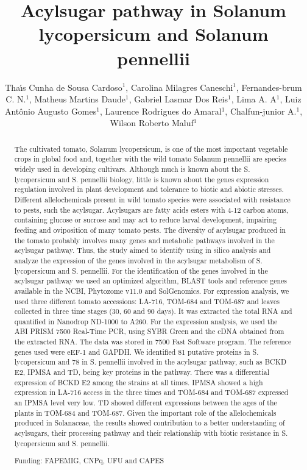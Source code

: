 \documentclass[twoside]{article}
\title{\vspace{-15mm}\fontsize{24pt}{10pt}\selectfont\textbf{Acylsugar pathway in Solanum lycopersicum and Solanum pennellii}} %
\author{Tha\'{\i}s Cunha de Sousa Cardoso$^1$, Carolina Milagres Caneschi$^1$, Fernandes-brum C. N.$^1$, Matheus Martins Daude$^1$, Gabriel Lasmar Dos Reis$^1$, Lima A. A$^1$, Luiz Ant\^onio Augusto Gomes$^1$, Laurence Rodrigues do Amaral$^1$, Chalfun-junior A.$^1$, Wilson Roberto Maluf$^1$}
\affil{1 UFU\\ }
\date{}
\begin{document}
\maketitle %

\thispagestyle{fancy} %


\begin{abstract}
The cultivated tomato, Solanum lycopersicum, is one of the most important vegetable crops in global food and, together with the wild tomato Solanum pennellii are species widely used in developing cultivars. Although much is known about the S. lycopersicum and S. pennellii biology, little is known about the genes expression regulation involved in plant development and tolerance to biotic and abiotic stresses. Different allelochemicals present in wild tomato species were associated with resistance to pests, such the acylsugar. Acylsugars are fatty acids esters with 4-12 carbon atoms, containing glucose or sucrose and may act to reduce larval development, impairing feeding and oviposition of many tomato pests. The diversity of acylsugar produced in the tomato probably involves many genes and metabolic pathways involved in the acylsugar pathway. Thus, the study aimed to identify using in silico analysis and analyze the expression of the genes involved in the acylsugar metabolism of S. lycopersicum and S. pennellii. For the identification of the genes involved in the acylsugar pathway we used an optimized algorithm, BLAST tools and reference genes available in the NCBI, Phytozome v11.0 and SolGenomics. For expression analysis, we used three different tomato accessions: LA-716, TOM-684 and TOM-687 and leaves collected in three time stages (30, 60 and 90 days). It was extracted the total RNA and quantified in Nanodrop\textsuperscript{\textcopyright} ND-1000 to A260. For the expression analysis, we used the ABI PRISM 7500 Real-Time PCR, using SYBR Green and the cDNA obtained from the extracted RNA. The data was stored in 7500 Fast Software program. The reference genes used were eEF-1 and GAPDH. We identified 81 putative proteins in S. lycopersicum and 78 in S. pennellii involved in the acylsugar pathway, such as BCKD E2, IPMSA and TD, being key proteins in the pathway. There was a differential expression of BCKD E2 among the strains at all times. IPMSA showed a high expression in LA-716 access in the three times and TOM-684 and TOM-687 expressed an IPMSA level very low. TD showed different expressions between the ages of the plants in TOM-684 and TOM-687. Given the important role of the allelochemicals produced in Solanaceae, the results showed contribution to a better understanding of acylsugars, their processing pathway and their relationship with biotic resistance in S. lycopersicum and S. pennellii.

Funding: FAPEMIG, CNPq, UFU and CAPES
\end{abstract}
\end{document}
